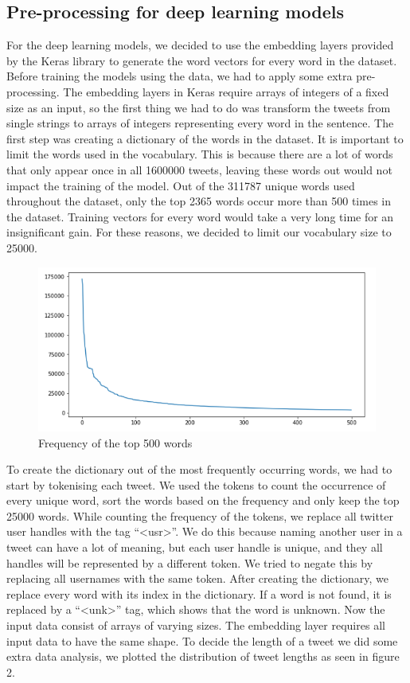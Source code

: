 \documentclass{article}
\begin{document}
\subsection{Pre-processing for deep learning models}
For the deep learning models, we decided to use the embedding layers provided by
the Keras library to generate the word vectors for every word in the dataset.
Before training the models using the data, we had to apply some extra
pre-processing. The embedding layers in Keras require arrays of integers of a
fixed size as an input, so the first thing we had to do was transform the tweets
from single strings to arrays of integers representing every word in the
sentence. The first step was creating a dictionary of the words in the dataset.
It is important to limit the words used in the vocabulary. This is because there
are a lot of words that only appear once in all 1600000 tweets, leaving these
words out would not impact the training of the model. Out of the 311787 unique
words used throughout the dataset, only the top 2365 words occur more than 500
times in the dataset. Training vectors for every word would take a very long
time for an insignificant gain. For these reasons, we decided to limit our
vocabulary size to 25000.

\begin{figure}[H]
  \centering
  \includegraphics[scale=0.65]{Length.PNG}
  \caption{Frequency of the top 500 words}
\end{figure}
To create the dictionary out of the most frequently occurring words, we had to
start by tokenising each tweet. We used the tokens to count the occurrence of
every unique word, sort the words based on the frequency and only keep the top
25000 words. While counting the frequency of the tokens, we replace all twitter
user handles with the tag “<usr>”. We do this because naming another user in a
tweet can have a lot of meaning, but each user handle is unique, and they all
handles will be represented by a different token. We tried to negate this by
replacing all usernames with the same token. After creating the dictionary, we
replace every word with its index in the dictionary. If a word is not found, it
is replaced by a “<unk>” tag, which shows that the word is unknown. Now the
input data consist of arrays of varying sizes. The embedding layer requires all
input data to have the same shape. To decide the length of a tweet we did some
extra data analysis, we plotted the distribution of tweet lengths as seen in
figure 2.
\end{document}
